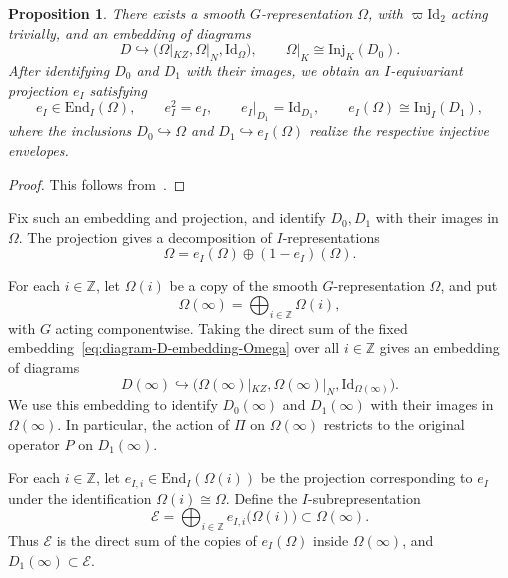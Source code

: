 \documentclass[10pt]{article}
\theoremstyle{plain}
\newtheorem{proposition}[theorem]{Proposition}
\theoremstyle{definition}
\theoremstyle{remark}
\newcommand{\Inj}{\mathrm{Inj}}
\newcommand{\End}{\mathrm{End}}
\newcommand{\Id}{\mathrm{Id}}
\begin{document}
\begin{proposition}\label{prop:diagram-injective-embedding}
There exists a smooth $G$-representation $\Omega$, with $\varpi\Id_2$ acting trivially, and an embedding of diagrams
\begin{equation}\label{eq:diagram-D-embedding-Omega}
D\hookrightarrow\bigl(\Omega|_{KZ},\Omega|_N,\Id_{\Omega}\bigr),
\qquad \Omega|_K\cong\Inj_K(D_0).
\end{equation}
After identifying $D_0$ and $D_1$ with their images, we obtain an $I$-equivariant projection $e_I$ satisfying
\begin{equation}\label{eq:Omega-I-projection}
e_I\in\End_I(\Omega),\qquad e_I^2=e_I,\qquad
 e_I|_{D_1}=\Id_{D_1},\qquad e_I(\Omega)\cong\Inj_I(D_1),
\end{equation}
where the inclusions $D_0\hookrightarrow\Omega$ and $D_1\hookrightarrow e_I(\Omega)$ realize the respective injective envelopes.
\end{proposition}

\begin{proof}
This follows from~\cite[Theorem~9.8]{BP12}.
\end{proof}

Fix such an embedding and projection, and identify $D_0,D_1$ with their images in $\Omega$. The projection gives a decomposition of $I$-representations
\[
\Omega=e_I(\Omega)\oplus(1-e_I)(\Omega).
\]

For each $i\in\mathbb{Z}$, let $\Omega(i)$ be a copy of the smooth $G$-representation $\Omega$, and put
\begin{equation}\label{eq:Omega-infinity}
\Omega(\infty)=\bigoplus_{i\in\mathbb{Z}}\Omega(i),
\end{equation}
with $G$ acting componentwise. Taking the direct sum of the fixed embedding~\eqref{eq:diagram-D-embedding-Omega} over all $i\in\mathbb{Z}$ gives an embedding of diagrams
\begin{equation}\label{eq:diagram-D-infinity-embedding-Omega}
D(\infty)\hookrightarrow
\bigl(\Omega(\infty)|_{KZ},\Omega(\infty)|_N,\Id_{\Omega(\infty)}\bigr).
\end{equation}
We use this embedding to identify $D_0(\infty)$ and $D_1(\infty)$ with their images in $\Omega(\infty)$. In particular, the action of $\Pi$ on $\Omega(\infty)$ restricts to the original operator $P$ on $D_1(\infty)$.

For each $i\in\mathbb{Z}$, let $e_{I,i}\in\End_I(\Omega(i))$ be the projection corresponding to $e_I$ under the identification $\Omega(i)\cong\Omega$. Define the $I$-subrepresentation
\begin{equation}\label{eq:calE-definition}
\mathcal E=\bigoplus_{i\in\mathbb{Z}}e_{I,i}\bigl(\Omega(i)\bigr)
\subset\Omega(\infty).
\end{equation}
Thus $\mathcal E$ is the direct sum of the copies of $e_I(\Omega)$ inside $\Omega(\infty)$, and $D_1(\infty)\subset\mathcal E$.
\end{document}
